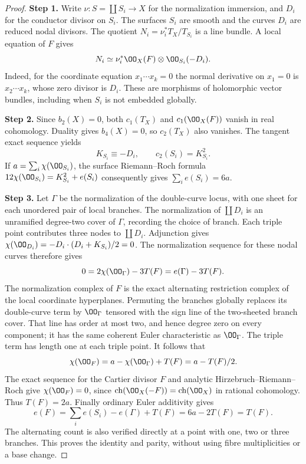 \begin{proof}
\noindent\textbf{Step 1.} Write $\nu:S=\coprod S_i\to X$ for the normalization immersion, and $D_i$
for the conductor divisor on $S_i$. The surfaces $S_i$ are smooth and
the curves $D_i$ are reduced nodal divisors. The quotient
$N_i=\nu_i^*T_X/T_{S_i}$ is a line bundle. A local equation of $F$ gives
\[
 N_i\simeq \nu_i^*\OO_X(F)\otimes\OO_{S_i}(-D_i).
\]
Indeed, for the coordinate equation $x_1\cdots x_k=0$ the normal
derivative on $x_1=0$ is $x_2\cdots x_k$, whose zero divisor is $D_i$.
These are morphisms of holomorphic vector bundles, including when
$S_i$ is not embedded globally.

\noindent\textbf{Step 2.} Since $b_2(X)=0$, both $c_1(T_X)$ and $c_1(\OO_X(F))$ vanish in real
cohomology. Duality gives $b_4(X)=0$, so $c_2(T_X)$ also vanishes. The
tangent exact sequence yields
\[
 K_{S_i}\equiv-D_i,\qquad c_2(S_i)=K_{S_i}^2.
\]
If $a=\sum_i\chi(\OO_{S_i})$, the surface Riemann--Roch formula
$12\chi(\OO_{S_i})=K_{S_i}^2+e(S_i)$ consequently gives
$\sum_i e(S_i)=6a$.

\noindent\textbf{Step 3.} Let $\Gamma$ be the normalization of the double-curve locus, with one
sheet for each unordered pair of local branches. The normalization of
$\coprod D_i$ is an unramified degree-two cover of $\Gamma$, recording
the choice of branch. Each triple point contributes three nodes to
$\coprod D_i$. Adjunction gives
$\chi(\OO_{D_i})=-D_i\cdot(D_i+K_{S_i})/2=0$. The normalization
sequence for these nodal curves therefore gives
\[
 0=2\chi(\OO_\Gamma)-3T(F)=e(\Gamma)-3T(F).
\]
The normalization complex of $F$ is the exact alternating restriction
complex of the local coordinate hyperplanes. Permuting the branches
globally replaces its double-curve term by $\OO_\Gamma$ tensored with
the sign line of the two-sheeted branch cover. That line has order at
most two, and hence degree zero on every component; it has the same
coherent Euler characteristic as $\OO_\Gamma$. The triple term has
length one at each triple point. It follows that
\[
 \chi(\OO_F)=a-\chi(\OO_\Gamma)+T(F)=a-T(F)/2.
\]
The exact sequence for the Cartier divisor $F$ and analytic
Hirzebruch--Riemann--Roch give $\chi(\OO_F)=0$, since
$\operatorname{ch}(\OO_X(-F))=\operatorname{ch}(\OO_X)$ in rational
cohomology. Thus $T(F)=2a$. Finally ordinary Euler additivity gives
\[
 e(F)=\sum_i e(S_i)-e(\Gamma)+T(F)=6a-2T(F)=T(F).
\]
The alternating count is also verified directly at a point with one,
two or three branches. This proves the identity and parity, without
using fibre multiplicities or a base change.
\end{proof}

